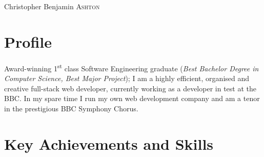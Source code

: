 \documentclass[class=article, crop=false]{standalone}
\begin{document}
\par{\centering
        {\Huge Christopher Benjamin \textsc{Ashton}
    }\bigskip\par}

\begin{center}
\customcontact
\end{center}


\section{Profile}

Award-winning 1\textsuperscript{st} class Software Engineering graduate (\emph{Best Bachelor Degree in Computer Science, Best Major Project}); I am a highly efficient, organised and creative full-stack web developer, currently working as a developer in test at the BBC. In my spare time I run my own web development company and am a tenor in the prestigious BBC Symphony Chorus.

\section{Key Achievements and Skills}
\end{document}
